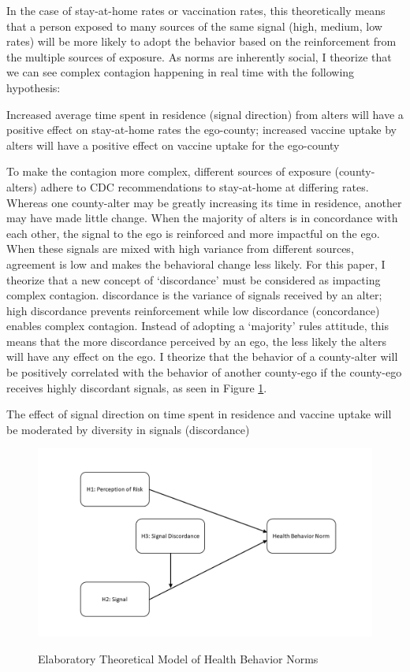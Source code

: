 In the case of stay-at-home rates or vaccination rates, this theoretically means
that a person exposed to many sources of the same signal (high, medium, low
rates) will be more likely to adopt the behavior based on the reinforcement from
the multiple sources of exposure. As norms are inherently social, I theorize
that we can see complex contagion happening in real time with the following
hypothesis:

\begin{hyp2} \label{hyp:direction}
Increased average time spent in residence (signal direction) from alters will have a positive effect on stay-at-home rates the ego-county; increased vaccine uptake by alters will have a positive effect on vaccine uptake for the ego-county
\end{hyp2}

To make the contagion more complex, different sources of exposure
(county-alters) adhere to CDC recommendations to stay-at-home at differing
rates. Whereas one county-alter may be greatly increasing its time in residence,
another may have made little change. When the majority of alters is in
concordance with each other, the signal to the ego is reinforced and more
impactful on the ego. When these signals are mixed with high variance from
different sources, agreement is low and makes the behavioral change less likely.
For this paper, I theorize that a new concept of `discordance' must be
considered as impacting complex contagion. discordance is the variance of
signals received by an alter; high discordance prevents reinforcement while low
discordance (concordance) enables complex contagion. Instead of adopting a
`majority' rules attitude, this means that the more discordance perceived by an
ego, the less likely the alters will have any effect on the ego. I theorize that
the behavior of a county-alter will be positively correlated with the behavior
of another county-ego if the county-ego receives highly discordant signals, as
seen in Figure \ref{fig:dag}.

\begin{hyp2} \label{hyp:discordance}
The effect of signal direction on time spent in residence and vaccine uptake will be moderated by diversity in signals (discordance)
\end{hyp2}

\begin{figure}
{\centering \includegraphics[width=0.8\linewidth]{figs/paper3/dag}}
\caption{Elaboratory Theoretical Model of Health Behavior Norms}\label{fig:dag}
\end{figure}

